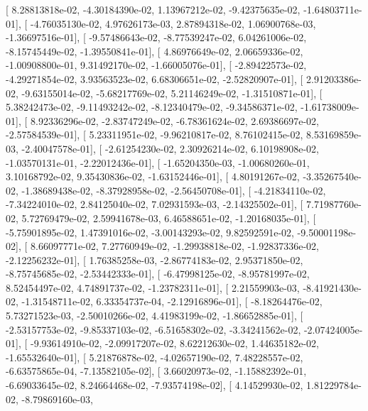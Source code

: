 \documentclass{article}
\begin{document}
       [  8.28813818e-02,  -4.30184390e-02,   1.13967212e-02,
         -9.42375635e-02,  -1.64803711e-01],
       [ -4.76035130e-02,   4.97626173e-03,   2.87894318e-02,
          1.06900768e-03,  -1.36697516e-01],
       [ -9.57486643e-02,  -8.77539247e-02,   6.04261006e-02,
         -8.15745449e-02,  -1.39550841e-01],
       [  4.86976649e-02,   2.06659336e-02,  -1.00908800e-01,
          9.31492170e-02,  -1.66005076e-01],
       [ -2.89422573e-02,  -4.29271854e-02,   3.93563523e-02,
          6.68306651e-02,  -2.52820907e-01],
       [  2.91203386e-02,  -9.63155014e-02,  -5.68217769e-02,
          5.21146249e-02,  -1.31510871e-01],
       [  5.38242473e-02,  -9.11493242e-02,  -8.12340479e-02,
         -9.34586371e-02,  -1.61738009e-01],
       [  8.92336296e-02,  -2.83747249e-02,  -6.78361624e-02,
          2.69386697e-02,  -2.57584539e-01],
       [  5.23311951e-02,  -9.96210817e-02,   8.76102415e-02,
          8.53169859e-03,  -2.40047578e-01],
       [ -2.61254230e-02,   2.30926214e-02,   6.10198908e-02,
         -1.03570131e-01,  -2.22012436e-01],
       [ -1.65204350e-03,  -1.00680260e-01,   3.10168792e-02,
          9.35430836e-02,  -1.63152446e-01],
       [  4.80191267e-02,  -3.35267540e-02,  -1.38689438e-02,
         -8.37928958e-02,  -2.56450708e-01],
       [ -4.21834110e-02,  -7.34224010e-02,   2.84125040e-02,
          7.02931593e-03,  -2.14325502e-01],
       [  7.71987760e-02,   5.72769479e-02,   2.59941678e-03,
          6.46588651e-02,  -1.20168035e-01],
       [ -5.75901895e-02,   1.47391016e-02,  -3.00143293e-02,
          9.82592591e-02,  -9.50001198e-02],
       [  8.66097771e-02,   7.27760949e-02,  -1.29938818e-02,
         -1.92837336e-02,  -2.12256232e-01],
       [  1.76385258e-03,  -2.86774183e-02,   2.95371850e-02,
         -8.75745685e-02,  -2.53442333e-01],
       [ -6.47998125e-02,  -8.95781997e-02,   8.52454497e-02,
          4.74891737e-02,  -1.23782311e-01],
       [  2.21559903e-03,  -8.41921430e-02,  -1.31548711e-02,
          6.33354737e-04,  -2.12916896e-01],
       [ -8.18264476e-02,   5.73271523e-03,  -2.50010266e-02,
          4.41983199e-02,  -1.86652885e-01],
       [ -2.53157753e-02,  -9.85337103e-02,  -6.51658302e-02,
         -3.34241562e-02,  -2.07424005e-01],
       [ -9.93614910e-02,  -2.09917207e-02,   8.62212630e-02,
          1.44635182e-02,  -1.65532640e-01],
       [  5.21876878e-02,  -4.02657190e-02,   7.48228557e-02,
         -6.63575865e-04,  -7.13582105e-02],
       [  3.66020973e-02,  -1.15882392e-01,  -6.69033645e-02,
          8.24664468e-02,  -7.93574198e-02],
       [  4.14529930e-02,   1.81229784e-02,  -8.79869160e-03,
\end{document}
